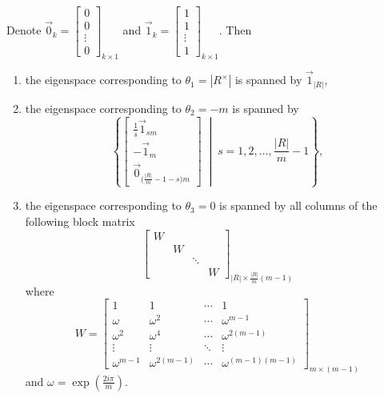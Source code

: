 \documentclass[12pt]{amsart}
\numberwithin{equation}{section}
\theoremstyle{definition}
\theoremstyle{definition} \numberwithin{equation}{section}
\begin{document}
Denote $\Vec{0}_k = 
\begin{bmatrix}
    0 \\
    0 \\
    \vdots \\
    0
\end{bmatrix}_{k \times 1}$ and $ \Vec{1}_k = \begin{bmatrix}
    1 \\
    1 \\
    \vdots \\
    1
\end{bmatrix}_{k \times 1}$.
Then 
\begin{enumerate}
    \item the eigenspace corresponding to $\theta_1 = |R^\times|$ is spanned by $\vec{1}_{|R|}$,
   
    \item the eigenspace corresponding to $\theta_2 = -m$ is spanned by 
    \[
    \left\{  \begin{bmatrix}
        \frac{1}{s} \vec{1}_{sm} \\
        -\vec{1}_m \\
        \vec{0}_{\big(\frac{|R|}{m} - 1 - s \big)m}
    \end{bmatrix}
    \;\middle|\; s = 1, 2, \ldots, \frac{|R|}{m}-1
    \right\},
    \]
    
    \item the eigenspace corresponding to $\theta_3 = 0$ is spanned by all columns of the following block matrix
    \begin{equation*}
    \begin{bmatrix}
        W &&&\\
        &W&&\\
        &&\ddots& \\
        &&&W
    \end{bmatrix}_{|R|\times\frac{|R|}{m}(m-1)}
\end{equation*}
where
\begin{equation*}
    W = \begin{bmatrix}
        1 & 1 & \cdots & 1 \\
        \omega & \omega^2 & \cdots & \omega^{m-1}\\
        \omega^2 & \omega^4 & \cdots & \omega^{2(m-1)}\\
        \vdots & \vdots & \ddots & \vdots \\
        \omega^{m-1} & \omega^{2(m-1)} & \cdots & \omega^{(m-1)(m-1)}
    \end{bmatrix}_{m\times(m-1)}
\end{equation*}
and $\omega=\exp(\frac{2i\pi}{m})$.
\end{enumerate}
\end{document}
